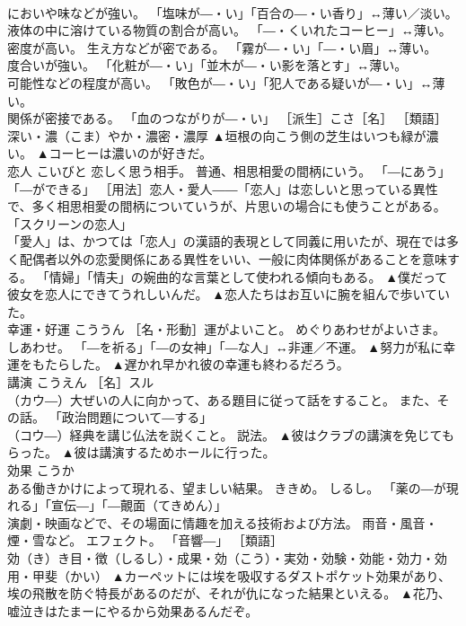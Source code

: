 \documentclass[8pt]{extreport}
\begin{document}
\begin{CJK}{UTF8}{min}
\\	においや味などが強い。 「塩味が―・い」「百合の―・い香り」↔薄い／淡い。 
\\	液体の中に溶けている物質の割合が高い。 「―・くいれたコーヒー」↔薄い。 
\\	密度が高い。 生え方などが密である。 「霧が―・い」「―・い眉」↔薄い。 
\\	度合いが強い。 「化粧が―・い」「並木が―・い影を落とす」↔薄い。 
\\	可能性などの程度が高い。 「敗色が―・い」「犯人である疑いが―・い」↔薄い。 
\\	関係が密接である。 「血のつながりが―・い」 ［派生］こさ［名］ ［類語］
\\	深い・濃（こま）やか・濃密・濃厚	▲垣根の向こう側の芝生はいつも緑が濃い。 ▲コーヒーは濃いのが好きだ。
\\	恋人	こいびと	恋しく思う相手。 普通、相思相愛の間柄にいう。 「―にあう」「―ができる」 ［用法］恋人・愛人――「恋人」は恋しいと思っている異性で、多く相思相愛の間柄についていうが、片思いの場合にも使うことがある。 「スクリーンの恋人」
\\	「愛人」は、かつては「恋人」の漢語的表現として同義に用いたが、現在では多く配偶者以外の恋愛関係にある異性をいい、一般に肉体関係があることを意味する。 「情婦」「情夫」の婉曲的な言葉として使われる傾向もある。	▲僕だって彼女を恋人にできてうれしいんだ。 ▲恋人たちはお互いに腕を組んで歩いていた。
\\	幸運・好運	こううん	［名・形動］運がよいこと。 めぐりあわせがよいさま。 しあわせ。 「―を祈る」「―の女神」「―な人」↔非運／不運。	▲努力が私に幸運をもたらした。 ▲遅かれ早かれ彼の幸運も終わるだろう。
\\	講演	こうえん	［名］スル 
\\	（カウ―）大ぜいの人に向かって、ある題目に従って話をすること。 また、その話。 「政治問題について―する」 
\\	（コウ―）経典を講じ仏法を説くこと。 説法。	▲彼はクラブの講演を免じてもらった。 ▲彼は講演するためホールに行った。
\\	効果	こうか	
\\	ある働きかけによって現れる、望ましい結果。 ききめ。 しるし。 「薬の―が現れる」「宣伝―」「―覿面（てきめん）」 
\\	演劇・映画などで、その場面に情趣を加える技術および方法。 雨音・風音・煙・雪など。 エフェクト。 「音響―」 ［類語］
\\	効（き）き目・徴（しるし）・成果・効（こう）・実効・効験・効能・効力・効用・甲斐（かい）	▲カーペットには埃を吸収するダストポケット効果があり、埃の飛散を防ぐ特長があるのだが、それが仇になった結果といえる。 ▲花乃、嘘泣きはたまーにやるから効果あるんだぞ。

\end{CJK}
\end{document}
